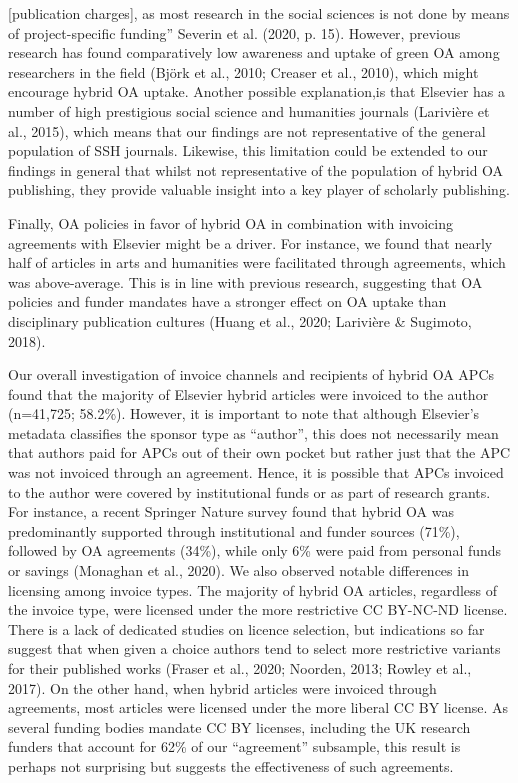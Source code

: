 \documentclass[a4paper,man,floatsintext,longtable,noextraspace,12pt]{apa6}
\begin{document}
{[}publication charges{]}, as most research in the social sciences is
not done by means of project-specific funding'' Severin et al. (2020, p.
15). However, previous research has found comparatively low awareness
and uptake of green OA among researchers in the field (Björk et al.,
2010; Creaser et al., 2010), which might encourage hybrid OA uptake.
Another possible explanation,is that Elsevier has a number of high
prestigious social science and humanities journals (Larivière et al.,
2015), which means that our findings are not representative of the
general population of SSH journals. Likewise, this limitation could be
extended to our findings in general that whilst not representative of
the population of hybrid OA publishing, they provide valuable insight
into a key player of scholarly publishing.

Finally, OA policies in favor of hybrid OA in combination with invoicing
agreements with Elsevier might be a driver. For instance, we found that
nearly half of articles in arts and humanities were facilitated through
agreements, which was above-average. This is in line with previous
research, suggesting that OA policies and funder mandates have a
stronger effect on OA uptake than disciplinary publication cultures
(Huang et al., 2020; Larivière \& Sugimoto, 2018).

Our overall investigation of invoice channels and recipients of hybrid
OA APCs found that the majority of Elsevier hybrid articles were
invoiced to the author (n=41,725; 58.2\%). However, it is important to
note that although Elsevier's metadata classifies the sponsor type as
``author'', this does not necessarily mean that authors paid for APCs
out of their own pocket but rather just that the APC was not invoiced
through an agreement. Hence, it is possible that APCs invoiced to the
author were covered by institutional funds or as part of research
grants. For instance, a recent Springer Nature survey found that hybrid
OA was predominantly supported through institutional and funder sources
(71\%), followed by OA agreements (34\%), while only 6\% were paid from
personal funds or savings (Monaghan et al., 2020). We also observed
notable differences in licensing among invoice types. The majority of
hybrid OA articles, regardless of the invoice type, were licensed under
the more restrictive CC BY-NC-ND license. There is a lack of dedicated
studies on licence selection, but indications so far suggest that when
given a choice authors tend to select more restrictive variants for
their published works (Fraser et al., 2020; Noorden, 2013; Rowley et
al., 2017). On the other hand, when hybrid articles were invoiced
through agreements, most articles were licensed under the more liberal
CC BY license. As several funding bodies mandate CC BY licenses,
including the UK research funders that account for 62\% of our
``agreement'' subsample, this result is perhaps not surprising but
suggests the effectiveness of such agreements.
\end{document}
